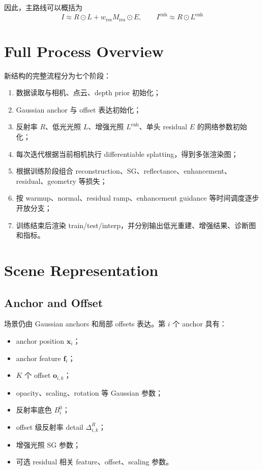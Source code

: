 \documentclass[11pt]{article}
\begin{document}
因此，主路线可以概括为
\begin{equation}
    \boxed{
    I \approx R \odot L + w_{\text{res}} M_{\text{res}} \odot E,
    \qquad
    I^{\text{enh}} \approx R \odot L^{\text{enh}}
    }
\end{equation}

\section{Full Process Overview}

新结构的完整流程分为七个阶段：
\begin{enumerate}[leftmargin=1.8em]
    \item 数据读取与相机、点云、depth prior 初始化；
    \item Gaussian anchor 与 offset 表达初始化；
    \item 反射率 $R$、低光光照 $L$、增强光照 $L^{\text{enh}}$、单头 residual $E$ 的网络参数初始化；
    \item 每次迭代根据当前相机执行 differentiable splatting，得到多张渲染图；
    \item 根据训练阶段组合 reconstruction、SG、reflectance、enhancement、residual、geometry 等损失；
    \item 按 warmup、normal、residual ramp、enhancement guidance 等时间调度逐步开放分支；
    \item 训练结束后渲染 train/test/interp，并分别输出低光重建、增强结果、诊断图和指标。
\end{enumerate}

\section{Scene Representation}

\subsection{Anchor and Offset}

场景仍由 Gaussian anchors 和局部 offsets 表达。第 $i$ 个 anchor 具有：
\begin{itemize}[leftmargin=1.5em]
    \item anchor position $\mathbf{x}_i$；
    \item anchor feature $\mathbf{f}_i$；
    \item $K$ 个 offset $\mathbf{o}_{i,k}$；
    \item opacity、scaling、rotation 等 Gaussian 参数；
    \item 反射率底色 $B_i^0$；
    \item offset 级反射率 detail $\Delta^R_{i,k}$；
    \item 增强光照 SG 参数；
    \item 可选 residual 相关 feature、offset、scaling 参数。
\end{itemize}
\end{document}
